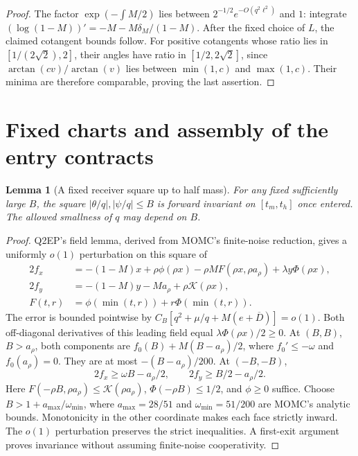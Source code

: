 \documentclass[11pt]{article}
\newtheorem{lemma}[theorem]{Lemma}
\theoremstyle{remark}\newtheorem{remark}[theorem]{Remark}
\newcommand{\Kfun}{\mathcal K}
\begin{document}
\begin{proof}
The factor $\exp(-\int M/2)$ lies between
$2^{-1/2}e^{-O(q^2\ell^2)}$ and $1$:
integrate $(\log(1-M))'=-M-M\delta_M/(1-M)$.
After the fixed choice of $L$, the claimed cotangent bounds
follow. For positive cotangents whose ratio lies in
$[1/(2\sqrt2),2]$, their angles have ratio in
$[1/2,2\sqrt2]$, since $\arctan(cv)/\arctan(v)$ lies between
$\min(1,c)$ and $\max(1,c)$.
Their minima are therefore comparable, proving the last assertion.
\end{proof}

\section{Fixed charts and assembly of the entry contracts}
\begin{lemma}[A fixed receiver square up to half mass]
\label{an02q2ecv1:square}
For any fixed sufficiently large $B$, the square
$|\theta/q|,|\psi/q|\le B$ is forward invariant on $[t_m,t_h]$
once entered. The allowed smallness of $q$ may depend on $B$.
\end{lemma}
\begin{proof}
Q2EP's field lemma, derived from MOMC's finite-noise reduction,
gives a uniformly $o(1)$ perturbation on this square of
\begin{align*}
 2f_x&=-(1-M)x+\rho\phi(\rho x)
         -\rho M F(\rho x,\rho a_\rho)+\lambda y\Phi(\rho x),\\
 2f_y&=-(1-M)y-Ma_\rho+\rho\Kfun(\rho x),\\
 F(t,r)&=\phi(\min(t,r))+r\Phi(\min(t,r)).
\end{align*}
The error is bounded pointwise by
$C_B[q^2+\mu/q+M(e+\overline D)]=o(1)$.
Both off-diagonal derivatives of this leading field equal
$\lambda\Phi(\rho x)/2\ge0$.
At $(B,B)$, $B>a_\rho$, both components are
$f_0(B)+M(B-a_\rho)/2$, where
$f_0' \le-\omega$ and $f_0(a_\rho)=0$.
They are at most $-(B-a_\rho)/200$.
At $(-B,-B)$,
\[
 2f_x\ge\omega B-a_\rho/2,\qquad
 2f_y\ge B/2-a_\rho/2 .
\]
Here $F(-\rho B,\rho a_\rho)\le\Kfun(\rho a_\rho)$,
$\Phi(-\rho B)\le1/2$, and $\phi\ge0$ suffice.
Choose $B>1+a_{\max}/\omega_{\min}$, where
$a_{\max}=28/51$ and $\omega_{\min}=51/200$ are MOMC's
analytic bounds. Monotonicity in the other coordinate makes
each face strictly inward. The $o(1)$ perturbation preserves
the strict inequalities. A first-exit argument proves invariance
without assuming finite-noise cooperativity.
\end{proof}
\end{document}
